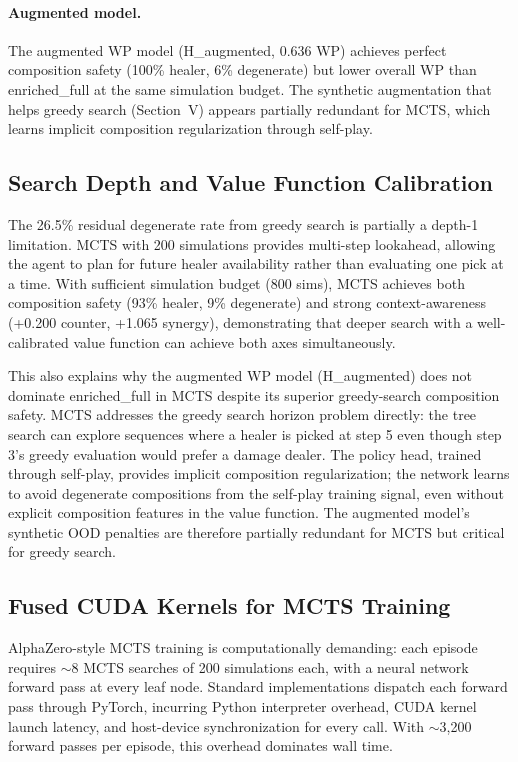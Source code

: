 \documentclass[journal]{IEEEtran}
\begin{document}
\paragraph{Augmented model.} The augmented WP model (H\_augmented, 0.636 WP) achieves perfect composition safety (100\% healer, 6\% degenerate) but lower overall WP than enriched\_full at the same simulation budget. The synthetic augmentation that helps greedy search (Section~V) appears partially redundant for MCTS, which learns implicit composition regularization through self-play.

\subsection{Search Depth and Value Function Calibration}

The 26.5\% residual degenerate rate from greedy search is partially a depth-1 limitation. MCTS with 200 simulations provides multi-step lookahead, allowing the agent to plan for future healer availability rather than evaluating one pick at a time. With sufficient simulation budget (800 sims), MCTS achieves both composition safety (93\% healer, 9\% degenerate) and strong context-awareness (+0.200 counter, +1.065 synergy), demonstrating that deeper search with a well-calibrated value function can achieve both axes simultaneously.

This also explains why the augmented WP model (H\_augmented) does not dominate enriched\_full in MCTS despite its superior greedy-search composition safety. MCTS addresses the greedy search horizon problem directly: the tree search can explore sequences where a healer is picked at step 5 even though step 3's greedy evaluation would prefer a damage dealer. The policy head, trained through self-play, provides implicit composition regularization; the network learns to avoid degenerate compositions from the self-play training signal, even without explicit composition features in the value function. The augmented model's synthetic OOD penalties are therefore partially redundant for MCTS but critical for greedy search.

\subsection{Fused CUDA Kernels for MCTS Training}
\label{sec:cuda}

AlphaZero-style MCTS training is computationally demanding: each episode requires $\sim$8 MCTS searches of 200 simulations each, with a neural network forward pass at every leaf node. Standard implementations dispatch each forward pass through PyTorch, incurring Python interpreter overhead, CUDA kernel launch latency, and host-device synchronization for every call. With $\sim$3,200 forward passes per episode, this overhead dominates wall time.
\end{document}
